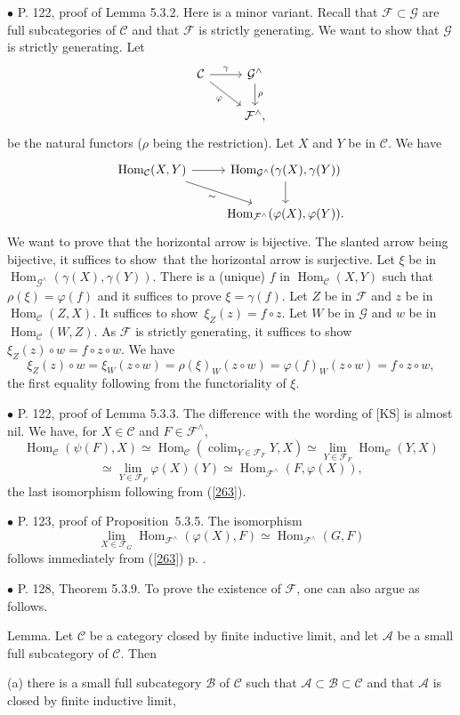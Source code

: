 \documentclass[12pt]{article}
\theoremstyle{remark}
\newcommand{\bu}{\bullet}
\newcommand{\n}{\noindent}
\newcommand{\A}{\mathcal A}
\newcommand{\B}{\mathcal B}
\newcommand{\C}{\mathcal C}
\newcommand{\F}{\mathcal F}
\newcommand{\G}{\mathcal G}
\newcommand{\p}{\varphi}
\newcommand{\pr}{Proposition}
\newcommand{\sts}{t suffices to show}
\DeclareMathOperator*{\co}{colim}
\DeclareMathOperator{\h}{Hom}
\begin{document}
\n$\bu$ P. 122, proof of Lemma 5.3.2. Here is a minor variant. Recall that $\F\subset\G$ are full subcategories of $\C$ and that $\F$ is strictly generating. We want to show that $\G$ is strictly generating. Let 
$$
\begin{tikzcd}
\C\ar{r}{\gamma}\ar{dr}[swap]{\p}&\G^\wedge\ar{d}{\rho}\\
&\F^\wedge,
\end{tikzcd}
$$ 
be the natural functors ($\rho$ being the restriction). Let $X$ and $Y$ be in $\C$. We have 
$$
\begin{tikzcd}
\h_\C(X,Y)\ar{r}\ar{dr}[swap]{\sim}&\h_{\G^\wedge}(\gamma(X),\gamma(Y))\ar{d}\\
&\h_{\F^\wedge}(\p(X),\p(Y)). 
\end{tikzcd}
$$ 
We want to prove that the horizontal arrow is bijective. The slanted arrow being bijective, i\sts\ that the horizontal arrow is surjective. Let $\xi$ be in $\h_{\G^\wedge}(\gamma(X),\gamma(Y))$. There is a (unique) $f$ in $\h_\C(X,Y)$ such that $\rho(\xi)=\p(f)$ and it suffices to prove $\xi=\gamma(f)$. Let $Z$ be in $\F$ and $z$ be in $\h_\C(Z,X)$. I\sts\ $\xi_Z(z)=f\circ z$. Let $W$ be in $\G$ and $w$ be in $\h_\C(W,Z)$. As $\F$ is strictly generating, i\sts\ $\xi_Z(z)\circ w=f\circ z\circ w$. We have 
$$
\xi_Z(z)\circ w=\xi_W(z\circ w)=\rho(\xi)_W(z\circ w)=\p(f)_W(z\circ w)
=f\circ z\circ w, 
$$ 
the first equality following from the functoriality of $\xi$. 


\n$\bu$ P. 122, proof of Lemma 5.3.3. The difference with the wording of [KS] is almost nil. We have, for $X\in\C$ and $F\in\F^\wedge$, 
$$
\h_\C(\psi(F),X)\simeq\h_\C\left(\co_{Y\in\F_F}Y,X\right)\simeq\lim_{Y\in\F_F}\h_\C(Y,X)
$$ 
$$
\simeq\lim_{Y\in\F_F}\p(X)(Y)\simeq\h_{\F^\wedge}(F,\p(X)),
$$ 
the last isomorphism following from (\ref{263}). 


\n$\bu$ P. 123, proof of \pr\ 5.3.5. The isomorphism 
$$
\lim_{X\in\F_G}\h_{\F^\wedge}(\p(X),F)\simeq\h_{\F^\wedge}(G,F) 
$$ 
follows immediately from (\ref{263}) p. \pageref{263}. 


\n$\bu$ P. 128, Theorem 5.3.9. To prove the existence of $\F$, one can also argue as follows. 

\n Lemma. Let $\C$ be a category closed by finite inductive limit, and let $\A$ be a small full subcategory of $\C$. Then 

\n(a) there is a small full subcategory $\B$ of $\C$ such that $\A\subset\B\subset \C$ and that $\A$ is closed by finite inductive limit, 
\end{document}
